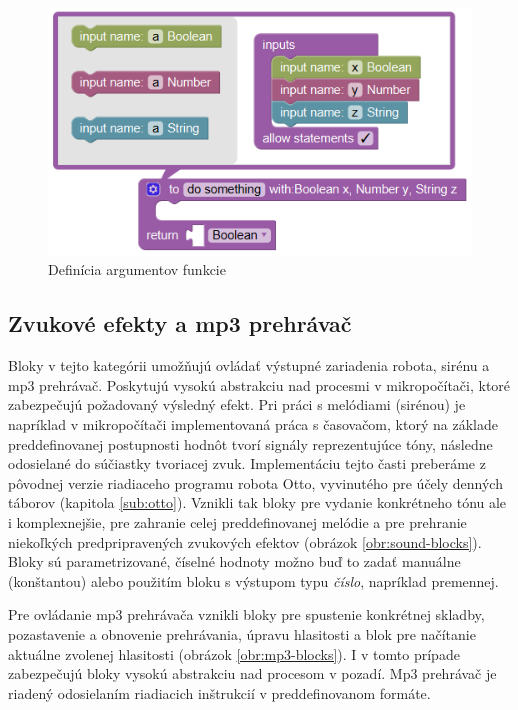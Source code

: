 \vspace{3cm}

\begin{figure}[bh!]
\centerline{\includegraphics[]{images/function-definition}}
\caption[Definícia argumentov funkcie]{Definícia argumentov funkcie}
\label{obr:function-definition}
\end{figure}

\newpage

\subsection{Zvukové efekty a mp3 prehrávač}
Bloky v tejto kategórii umožňujú ovládať výstupné zariadenia robota, sirénu a mp3 prehrávač. Poskytujú vysokú abstrakciu nad procesmi v mikropočítači, ktoré zabezpečujú požadovaný výsledný efekt. Pri práci s melódiami (sirénou) je napríklad v mikropočítači implementovaná práca s časovačom, ktorý na základe preddefinovanej postupnosti hodnôt tvorí signály reprezentujúce tóny, následne odosielané do súčiastky tvoriacej zvuk. Implementáciu tejto časti preberáme z pôvodnej verzie riadiaceho programu robota Otto, vyvinutého pre účely denných táborov (kapitola \ref{sub:otto}). Vznikli tak bloky pre vydanie konkrétneho tónu ale i komplexnejšie, pre zahranie celej preddefinovanej melódie a pre prehranie niekoľkých predpripravených zvukových efektov (obrázok \ref{obr:sound-blocks}). Bloky sú parametrizované, číselné hodnoty možno buď to zadať manuálne (konštantou) alebo použitím bloku s výstupom typu \textit{číslo}, napríklad premennej.

Pre ovládanie mp3 prehrávača vznikli bloky pre spustenie konkrétnej skladby, pozastavenie a obnovenie prehrávania, úpravu hlasitosti a blok pre načítanie aktuálne zvolenej hlasitosti (obrázok \ref{obr:mp3-blocks}). I v tomto prípade zabezpečujú bloky vysokú abstrakciu nad procesom v pozadí. Mp3 prehrávač je riadený odosielaním riadiacich inštrukcií v preddefinovanom formáte.

